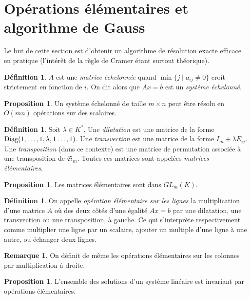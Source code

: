 \documentclass[11pt,a4paper,twocolumn]{article}
\theoremstyle{definition}
\newtheorem{definition}[equation]{Définition}
\newtheorem{proposition}[equation]{Proposition}
\newtheorem{remark}[equation]{Remarque}
\newcounter{n}
\def\Sigmap{\mathfrak{S}}
\begin{document}
\section{Opérations élémentaires et algorithme de Gauss}

Le but de cette section est d'obtenir un algorithme de résolution exacte
efficace en pratique (l'intérêt de la règle de Cramer étant surtout
théorique).

\begin{definition}
  $A$ est une \emph{matrice échelonnée} quand $\min \{j \mid a_{ij} \neq 0\}$ croît
  strictement en fonction de $i$. On dit alors que $Ax = b$ est un \emph{système
    échelonné}.
\end{definition}
\begin{proposition}
  Un système échelonné de taille $m \times n$ peut être résolu en $O(mn)$
  opérations sur des scalaires.
\end{proposition}
\begin{definition}
  Soit $\lambda \in K^*$. Une \emph{dilatation} est une matrice de la forme
  $\textnormal{Diag}(1,\ldots, 1, \lambda, 1 \ldots, 1)$. Une
  \emph{transvection} est une matrice de la forme $I_m + \lambda E_{ij}$. Une
  \emph{transposition} (dans ce contexte) est une matrice de permutation
  associée à une transposition de $\Sigmap_m$. Toutes ces matrices sont appelées
  \emph{matrices élémentaires}.
\end{definition}
\begin{proposition}
  Les matrices élémentaires sont dans $GL_m(K)$.
\end{proposition}
\begin{definition}
  On appelle \emph{opération élémentaire sur les lignes} la multiplication d'une
  matrice $A$ où des deux côtés d'une égalité $Ax = b$ par une dilatation, une
  transvection ou une transposition, à gauche. Ce qui s'interprète
  respectivement comme multiplier une ligne par un scalaire, ajouter un multiple
  d'une ligne à une autre, ou échanger deux lignes.
\end{definition}
\begin{remark}
  On définit de même les opérations élémentaires sur les colonnes par
  multiplication à droite.
\end{remark}
\begin{proposition}
  L'ensemble des solutions d'un système linéaire est invariant par opérations
  élémentaires.
\end{proposition}
\end{document}
